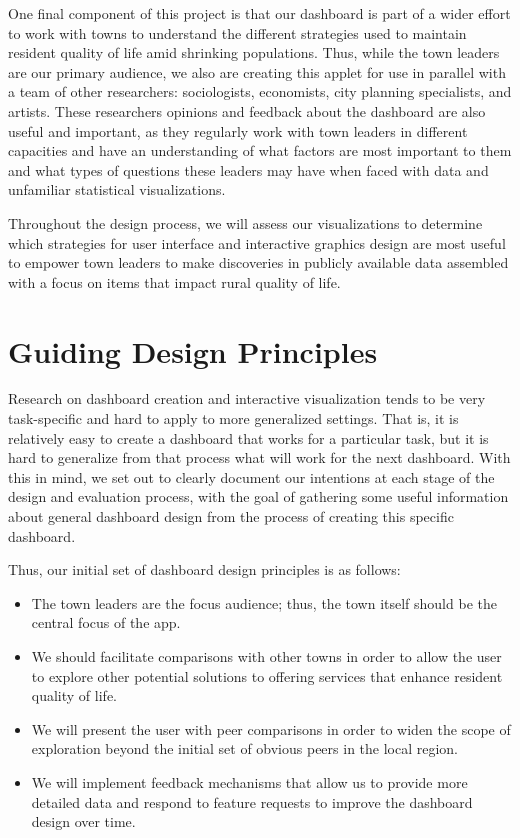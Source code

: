 \documentclass[print]{nuthesis}
\begin{document}
One final component of this project is that our dashboard is part of a wider effort to work with towns to understand the different strategies used to maintain resident quality of life amid shrinking populations. Thus, while the town leaders are our primary audience, we also are creating this applet for use in parallel with a team of other researchers: sociologists, economists, city planning specialists, and artists. These researchers opinions and feedback about the dashboard are also useful and important, as they regularly work with town leaders in different capacities and have an understanding of what factors are most important to them and what types of questions these leaders may have when faced with data and unfamiliar statistical visualizations.

Throughout the design process, we will assess our visualizations to determine which strategies for user interface and interactive graphics design are most useful to empower town leaders to make discoveries in publicly available data assembled with a focus on items that impact rural quality of life.

\hypertarget{guiding-design-principles}{%
\section{Guiding Design Principles}\label{guiding-design-principles}}

Research on dashboard creation and interactive visualization tends to be very task-specific and hard to apply to more generalized settings. That is, it is relatively easy to create a dashboard that works for a particular task, but it is hard to generalize from that process what will work for the next dashboard. With this in mind, we set out to clearly document our intentions at each stage of the design and evaluation process, with the goal of gathering some useful information about general dashboard design from the process of creating this specific dashboard.

Thus, our initial set of dashboard design principles is as follows:

\begin{itemize}
\item The town leaders are the focus audience; thus, the town itself should be the central focus of the app.
\item We should facilitate comparisons with other towns in order to allow the user to explore other potential solutions to offering services that enhance resident quality of life.
\item We will present the user with peer comparisons in order to widen the scope of exploration beyond the initial set of obvious peers in the local region.
\item We will implement feedback mechanisms that allow us to provide more detailed data and respond to feature requests to improve the dashboard design over time.
\end{itemize}
\end{document}
